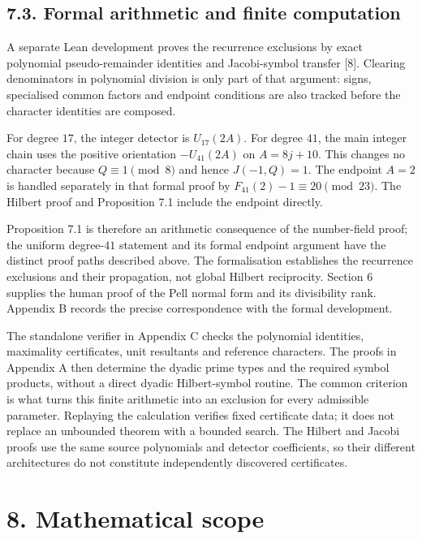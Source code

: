 \documentclass[11pt,a4paper]{article}
\begin{document}
\subsection{7.3. Formal arithmetic and finite
computation}\label{verification}

A separate Lean development proves the recurrence exclusions by exact
polynomial pseudo-remainder identities and Jacobi-symbol transfer
{[}8{]}. Clearing denominators in polynomial division is only part of
that argument: signs, specialised common factors and endpoint conditions
are also tracked before the character identities are composed.

For degree \(17\), the integer detector is \(U_{17}(2A)\). For degree
\(41\), the main integer chain uses the positive orientation
\(-U_{41}(2A)\) on \(A=8j+10\). This changes no character because
\(Q\equiv1\pmod8\) and hence \(J(-1,Q)=1\). The endpoint \(A=2\) is
handled separately in that formal proof by
\(F_{41}(2)-1\equiv20\pmod{23}\). The Hilbert proof and Proposition 7.1
include the endpoint directly.

Proposition 7.1 is therefore an arithmetic consequence of the
number-field proof; the uniform degree-\(41\) statement and its formal
endpoint argument have the distinct proof paths described above. The
formalisation establishes the recurrence exclusions and their
propagation, not global Hilbert reciprocity. Section 6 supplies the
human proof of the Pell normal form and its divisibility rank. Appendix
B records the precise correspondence with the formal development.

The standalone verifier in Appendix C checks the polynomial identities,
maximality certificates, unit resultants and reference characters. The
proofs in Appendix A then determine the dyadic prime types and the
required symbol products, without a direct dyadic Hilbert-symbol
routine. The common criterion is what turns this finite arithmetic into
an exclusion for every admissible parameter. Replaying the calculation
verifies fixed certificate data; it does not replace an unbounded
theorem with a bounded search. The Hilbert and Jacobi proofs use the
same source polynomials and detector coefficients, so their different
architectures do not constitute independently discovered certificates.

\section{8. Mathematical scope}\label{conclusion}
\end{document}
